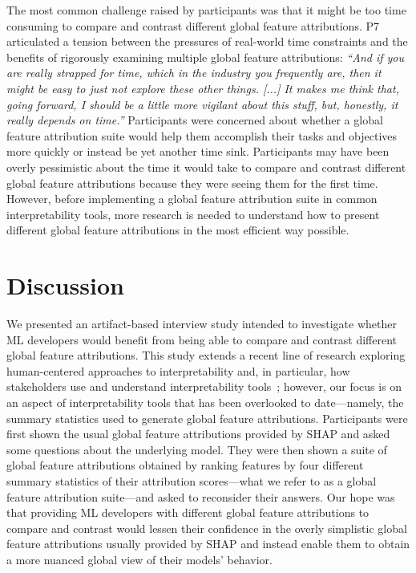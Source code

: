 \documentclass[11pt,dvipdfmx]{article}
\begin{document}
The most common challenge raised by participants was that it might be
too time consuming to compare and contrast different global feature
attributions. P7 articulated a tension between the pressures of
real-world time constraints and the benefits of rigorously examining
multiple global feature attributions: \textit{``And if you are really
  strapped for time, which in the industry you frequently are, then it
  might be easy to just not explore these other things. [...] It makes
  me think that, going forward, I should be a little more vigilant
  about this stuff, but, honestly, it really depends on time.''}
Participants were concerned about whether a global feature attribution
suite would help them accomplish their tasks and objectives more
quickly or instead be yet another time sink.  Participants may have
been overly pessimistic about the time it would take to compare and
contrast different global feature attributions because they were
seeing them for the first time. However, before implementing a global
feature attribution suite in common interpretability tools, more
research is needed to understand how to present different global
feature attributions in the most efficient way possible.

\section{Discussion}

We presented an artifact-based interview study intended to investigate
whether ML developers would benefit from being able to compare and
contrast different global feature attributions. This study extends a
recent line of research exploring human-centered approaches to
interpretability and, in particular, how stakeholders use and
understand interpretability tools~\citep{Lim, Bunt, Bussone, Hohman,
  Lage, Abdul, Hullman, InterpretingInterpretability, Zhang,
  Poursabzi-Sangdeh,AM21,VW21}; however, our focus is on an aspect of
interpretability tools that has been overlooked to date---namely, the
summary statistics used to generate global feature
attributions. Participants were first shown the usual global feature
attributions provided by SHAP and asked some questions about the
underlying model. They were then shown a suite of global feature
attributions obtained by ranking features by four different summary
statistics of their attribution scores---what we refer to as a global
feature attribution suite---and asked to reconsider their answers. Our
hope was that providing ML developers with different global feature
attributions to compare and contrast would lessen their confidence in
the overly simplistic global feature attributions usually provided by
SHAP and instead enable them to obtain a more nuanced global view of
their models' behavior.
\end{document}
